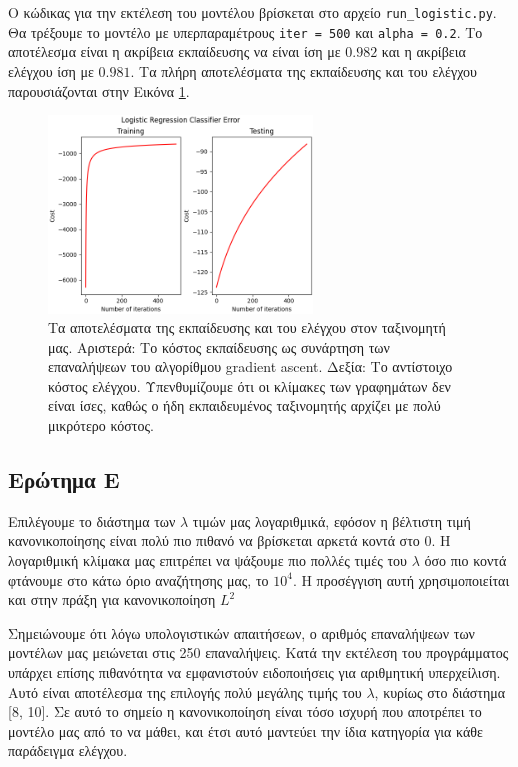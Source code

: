 \documentclass{article}
\newcommand{\code}{\texttt}
\begin{document}
Ο κώδικας για την εκτέλεση του μοντέλου βρίσκεται στο αρχείο \code{run\_logistic.py}. Θα τρέξουμε το μοντέλο με υπερπαραμέτρους \code{iter = 500} και \code{alpha = 0.2}. Το αποτέλεσμα είναι η ακρίβεια εκπαίδευσης να είναι ίση με $0.982$ και η ακρίβεια ελέγχου ίση με $0.981$. Τα πλήρη αποτελέσματα της εκπαίδευσης και του ελέγχου παρουσιάζονται στην Εικόνα \ref{logistic_train_test}.

\begin{figure}
	\includegraphics[width=7cm]{logistic_error.png}
	\centering
	\caption{Τα αποτελέσματα της εκπαίδευσης και του ελέγχου στον ταξινομητή μας. Αριστερά: Το κόστος εκπαίδευσης ως συνάρτηση των επαναλήψεων του αλγορίθμου gradient ascent. Δεξία: Το αντίστοιχο κόστος ελέγχου. Υπενθυμίζουμε ότι οι κλίμακες των γραφημάτων δεν είναι ίσες, καθώς ο ήδη εκπαιδευμένος ταξινομητής αρχίζει με πολύ μικρότερο κόστος. }
	\label{logistic_train_test}
\end{figure}


\subsection{Ερώτημα Ε}
Επιλέγουμε το διάστημα των \code{$\lambda$} τιμών μας λογαριθμικά, εφόσον η βέλτιστη τιμή κανονικοποίησης είναι πολύ πιο πιθανό να βρίσκεται αρκετά κοντά στο 0. Η λογαριθμική κλίμακα μας επιτρέπει να ψάξουμε πιο πολλές τιμές του \code{$\lambda$} όσο πιο κοντά φτάνουμε στο κάτω όριο αναζήτησης μας, το $10^{4}$. Η προσέγγιση αυτή χρησιμοποιείται και στην πράξη για κανονικοποίηση $L^{2}$ \cite{jerome}\par

Σημειώνουμε ότι λόγω υπολογιστικών απαιτήσεων, ο αριθμός επαναλήψεων των μοντέλων μας μειώνεται στις 250 επαναλήψεις. Κατά την εκτέλεση του προγράμματος υπάρχει επίσης πιθανότητα να εμφανιστούν ειδοποιήσεις για αριθμητική υπερχείλιση. Αυτό είναι αποτέλεσμα της επιλογής πολύ μεγάλης τιμής του \code{$\lambda$}, κυρίως στο διάστημα [8, 10]. Σε αυτό το σημείο η κανονικοποίηση είναι τόσο ισχυρή που αποτρέπει το μοντέλο μας από το να μάθει, και έτσι αυτό μαντεύει την ίδια κατηγορία για κάθε παράδειγμα ελέγχου.\par
\end{document}
